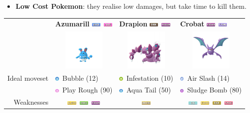 \documentclass[12pt]{beamer}
\newcommand{\darkfull}{\includegraphics[height=0.2cm]{../../images/type/full/Dark.png}}
\newcommand{\electricfull}{\includegraphics[height=0.2cm]{../../images/type/full/Electric.png}}
\newcommand{\fairyfull}{\includegraphics[height=0.2cm]{../../images/type/full/Fairy.png}}
\newcommand{\flyingfull}{\includegraphics[height=0.2cm]{../../images/type/full/Flying.png}}
\newcommand{\grassfull}{\includegraphics[height=0.2cm]{../../images/type/full/Grass.png}}
\newcommand{\groundfull}{\includegraphics[height=0.2cm]{../../images/type/full/Ground.png}}
\newcommand{\icefull}{\includegraphics[height=0.2cm]{../../images/type/full/Ice.png}}
\newcommand{\psychicfull}{\includegraphics[height=0.2cm]{../../images/type/full/Psychic.png}}
\newcommand{\rockfull}{\includegraphics[height=0.2cm]{../../images/type/full/Rock.png}}
\newcommand{\waterfull}{\includegraphics[height=0.2cm]{../../images/type/full/Water.png}}
\newcommand{\poisonfull}{\includegraphics[height=0.2cm]{../../images/type/full/Poison.png}}
\newcommand{\watersimp}{\includegraphics[height=0.2cm]{../../images/type/simplified/water.png}}
\newcommand{\fairysimp}{\includegraphics[height=0.2cm]{../../images/type/simplified/fairy.png}}
\newcommand{\flyingsimp}{\includegraphics[height=0.2cm]{../../images/type/simplified/flying.png}}
\newcommand{\poisonsimp}{\includegraphics[height=0.2cm]{../../images/type/simplified/poison.png}}
\newcommand{\bugsimp}{\includegraphics[height=0.2cm]{../../images/type/simplified/bug.png}}
\begin{document}
\begin{frame}
\begin{block}{}
\begin{footnotesize}
\begin{itemize}
  \item \textbf{Low Cost Pokemon}: they realise low damages, but take time to kill them.
\end{itemize}

\begin{center}
\begin{tabular}{rp{3.2cm}p{3.2cm}p{3.2cm}}
& \textbf{Azumarill} \hfill\waterfull~\fairyfull & \textbf{Drapion} \hfill \darkfull~\poisonfull & \textbf{Crobat} \hfill \poisonfull~\flyingfull  \\
& \multicolumn{1}{c}{\includegraphics[width=2cm]{../../images/pokemon/Azumarill}} &
\multicolumn{1}{c}{\includegraphics[width=2cm]{../../images/pokemon/Drapion}} &
\multicolumn{1}{c}{\includegraphics[width=2cm]{../../images/pokemon/Crobat}}  \\ \hline
Ideal moveset &  \watersimp~Bubble (12)& \bugsimp~Infestation (10) & \flyingsimp~Air Slash (14)  \\
&  \fairysimp~Play Rough (90) &  \watersimp~Aqua Tail (50) & \poisonsimp~Sludge Bomb (80)  \\ \hline
Weaknesses  & \multicolumn{1}{c}{\electricfull~\grassfull~\poisonfull}  &  \multicolumn{1}{c}{\groundfull} & \multicolumn{1}{c}{\icefull~\electricfull~\rockfull~\psychicfull} \\
\end{tabular}
\end{center}



\end{footnotesize}
\end{block}
\end{frame}
\end{document}
